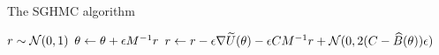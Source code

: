 \begin{algorithm}
    \caption{The SGHMC algorithm}\label{alg:sghmc}
    \begin{algorithmic}
            \State $r \sim \mathcal N(0,1)$ 
                \State $\theta \gets \theta + \epsilon M^{-1}r$
                \State $r \gets r - \epsilon \nabla \widetilde U(\theta) - \epsilon CM^{-1}r + \mathcal N(0, 2(C- \widehat B(\theta))\epsilon)$
            \EndFor
        \EndFor
    \end{algorithmic}
\end{algorithm}